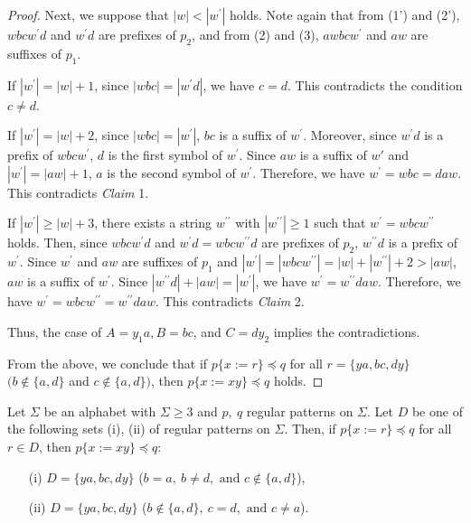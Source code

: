 \begin{proof}
  Next, we suppose that $|w| < |w^{\prime}|$ holds.
  Note again that from (1') and (2'), $wbcw^{\prime}d$ and $w^{\prime}d$ are prefixes of $p_{2}$, and from (2) and (3), $awbcw^{\prime}$ and $aw$ are suffixes of $p_{1}$.
  
  If $|w^{\prime}|=|w|+1$, since $|wbc|=|w^{\prime}d|$, we have $c=d$. This contradicts the condition $c \ne d$.
  
  If $|w^{\prime}|=|w|+2$, since $|wbc|=|w^{\prime}|$, $bc$ is a suffix of $w^{\prime}$.
  Moreover, since $w^{\prime}d$ is a prefix of $wbcw^{\prime}$, $d$ is the first symbol of $w^{\prime}$.
  Since $aw$ is a suffix of $w'$ and $|w^{\prime}|=|aw|+1$, $a$ is the second symbol of $w^{\prime}$.
  Therefore, we have $w^{\prime}=wbc=daw$.
  This contradicts \textit{Claim} 1.
  
  If $|w^{\prime}| \ge |w|+3$, there exists a string $w^{\prime\prime}$ with $|w^{\prime\prime}| \geq 1$ such that $w^{\prime} = wbcw^{\prime\prime}$ holds.
  Then, since $wbcw^{\prime}d$ and $w^{\prime}d=wbcw^{\prime\prime}d$ are prefixes of $p_{2}$, $w^{\prime\prime}d$ is a prefix of $w^{\prime}$.
  Since $w^{\prime}$ and $aw$ are suffixes of $p_{1}$ and $|w^{\prime}|=|wbcw^{\prime\prime}|=|w|+|w^{\prime\prime}|+2 > |aw|$, $aw$ is a suffix of $w^{\prime}$.
  Since $|w^{\prime\prime}d| + |aw| = |w^{\prime}|$, we have $w^{\prime} = w^{\prime\prime}daw$.
  Therefore, we have $w^{\prime}=wbcw^{\prime\prime}=w^{\prime\prime}daw$.
  This contradicts \textit{Claim} 2.

  Thus, the case of $A=y_{1}a,B=bc$, and $C=dy_{2}$ implies the contradictions.
  
  From the above, we conclude that if $p \{ x := r \} \preceq q$ for all $r = \{ ya, bc, dy \}$ $(b \not\in \{a,d\}$ and $c \not\in \{a,d\})$, then $p \{ x := xy \} \preceq q$ holds.
  \end{proof}

\begin{lem}\label{片方}
Let $\Sigma$ be an alphabet with $\Sigma \ge 3$ and $p,~q$ regular patterns on $\Sigma$.
Let $D$ be one of the following sets \textrm{(i), (ii)} of regular patterns on $\Sigma$.
Then, if $p \{ x := r \} \preceq q$ for all $r \in D$, then $p \{ x := xy \} \preceq q$:
\begin{enumerate}
\item[{\rm (i)}] $D=\{ ya, bc, dy \}$ ($b = a,~b \not= d,\mbox{~and~}c \not\in \{a,d\}$),
\item[{\rm (ii)}] $D=\{ ya, bc, dy \}$ ($b \not\in \{a,d\},~c = d,\mbox{~and~} c \not = a$).
\end{enumerate}
\end{lem}

